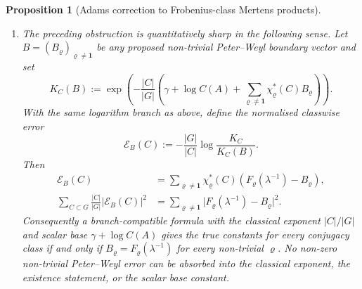 \documentclass[11pt,a4paper]{amsart}
\theoremstyle{plain}
\newtheorem{proposition}[theorem]{Proposition}
\theoremstyle{definition}
\theoremstyle{remark}
\newcommand{\abs}[1]{\lvert #1 \rvert}
\begin{document}
\begin{proposition}[Adams correction to Frobenius-class Mertens products]
\begin{enumerate}[label=\textup{(\Alph*)}]
    \[
      K_C^{\mathrm{Art}}
      :=
      \exp\!\left(
        -\frac{|C|}{|G|}
        \left(
          \gamma+\log C(A)
          +\sum_{\varrho\neq\mathbf1}
            \chi_\varrho^\ast(C)\mathcal L_\varrho(\lambda^{-1})
        \right)
      \right).
    \]
    Then the naive constants satisfy
    \begin{equation}\label{eq:comparison-artin-error}
      \log\frac{K_C}{K_C^{\mathrm{Art}}}
      =
      -\frac{|C|}{|G|}
        \sum_{\varrho\neq\mathbf1}
          \chi_\varrho^\ast(C)
          \left(F_\varrho(\lambda^{-1})-
          \mathcal L_\varrho(\lambda^{-1})\right),
    \end{equation}
    and all class constants are unchanged by this substitution if and only if
    \(F_\varrho(\lambda^{-1})=\mathcal L_\varrho(\lambda^{-1})\) for every
    non-trivial \(\varrho\).  Thus the novelty calibrated by this proposition
    is exactly the fixed-label Adams--M\"obius determinant constant and the
    Peter--Weyl obstruction to replacing it by an ordinary Artin logarithm.
    \item The preceding obstruction is quantitatively sharp in the following
    sense.  Let \(B=(B_\varrho)_{\varrho\ne\mathbf1}\) be any proposed
    non-trivial Peter--Weyl boundary vector and set
    \[
      K_C(B):=
      \exp\!\left(
        -\frac{|C|}{|G|}
        \left(
          \gamma+\log C(A)
          +\sum_{\varrho\neq\mathbf1}
            \chi_\varrho^\ast(C)B_\varrho
        \right)
      \right).
    \]
    With the same logarithm branch as above, define the normalised classwise
    error
    \[
      \mathscr E_B(C):=-\frac{|G|}{|C|}
        \log\frac{K_C}{K_C(B)}.
    \]
    Then
    \begin{equation}\label{eq:comparison-parseval-bound}
      \begin{aligned}
      \mathscr E_B(C)
      &=
      \sum_{\varrho\ne\mathbf1}
        \chi_\varrho^\ast(C)
        \left(F_\varrho(\lambda^{-1})-B_\varrho\right),\\
      \sum_{C\subset G}\frac{|C|}{|G|}\abs{\mathscr E_B(C)}^2
      &=
      \sum_{\varrho\ne\mathbf1}
        \abs{F_\varrho(\lambda^{-1})-B_\varrho}^2 .
      \end{aligned}
    \end{equation}
    Consequently a branch-compatible formula with the classical exponent
    \(|C|/|G|\) and scalar base \(\gamma+\log C(A)\) gives the true constants
    for every conjugacy class if and only if
    \(B_\varrho=F_\varrho(\lambda^{-1})\) for every non-trivial
    \(\varrho\).  No non-zero non-trivial Peter--Weyl error can be absorbed
    into the classical exponent, the existence statement, or the scalar base
    constant.
  \end{enumerate}
\end{proposition}
\end{document}
